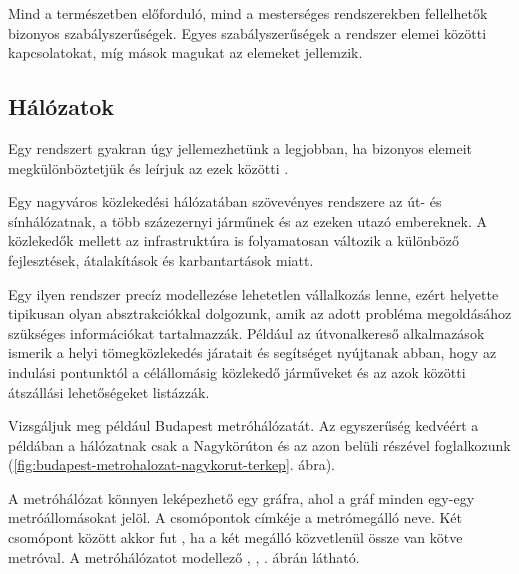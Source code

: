 Mind a természetben előforduló, mind a mesterséges rendszerekben fellelhetők bizonyos szabályszerűségek. Egyes szabályszerűségek a rendszer elemei közötti kapcsolatokat, míg mások magukat az elemeket jellemzik.

\subsection{Hálózatok}


Egy rendszert gyakran úgy jellemezhetünk a legjobban, ha bizonyos elemeit megkülönböztetjük és leírjuk az ezek közötti .

\begin{pelda}
	Egy nagyváros közlekedési hálózatában szövevényes rendszere az út- és sínhálózatnak, a több százezernyi járműnek és az ezeken utazó embereknek. A közlekedők mellett az infrastruktúra is folyamatosan változik a különböző fejlesztések, átalakítások és karbantartások miatt.
	
	Egy ilyen rendszer precíz modellezése lehetetlen vállalkozás lenne, ezért helyette tipikusan olyan absztrakciókkal dolgozunk, amik az adott probléma megoldásához szükséges információkat tartalmazzák. Például az útvonalkereső alkalmazások ismerik a helyi tömegközlekedés járatait és segítséget nyújtanak abban, hogy az indulási pontunktól a célállomásig közlekedő járműveket és az azok közötti átszállási lehetőségeket listázzák.
	
	Vizsgáljuk meg például Budapest metróhálózatát. Az egyszerűség kedvéért a példában  a hálózatnak csak a Nagykörúton és az azon belüli részével foglalkozunk (\ref{fig:budapest-metrohalozat-nagykorut-terkep}. ábra).
\end{pelda}

	A metróhálózat könnyen leképezhető egy gráfra, ahol a gráf minden  egy-egy metróállomásokat jelöl. A csomópontok címkéje a metrómegálló neve. Két csomópont között akkor fut , ha a két megálló közvetlenül össze van kötve metróval. A metróhálózatot modellező , ,  . ábrán látható.

